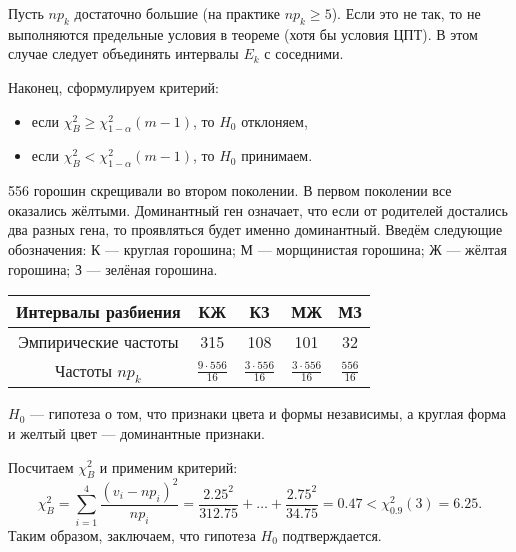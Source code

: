 \begin{remark*} 
  Пусть $np_k$ достаточно большие (на практике $np_k \geqslant
5$). Если это не так, то не выполняются предельные условия в теореме (хотя бы
условия ЦПТ). В этом случае следует объединять интервалы $E_k$ с соседними.
\end{remark*}

Наконец, сформулируем критерий:
\begin{itemize}[label=---]
  \item если $\chi^2_B \geqslant \chi^2_{1-\alpha} (m-1)$, то $H_0$ отклоняем,
  \item если $\chi^2_B < \chi^2_{1-\alpha}(m-1)$, то $H_0$ принимаем.
\end{itemize}

\begin{ex}[Мендель]
  556 горошин скрещивали во втором поколении.
  В первом поколении все оказались жёлтыми.
  Доминантный ген означает, что если от родителей достались два разных гена,
  то проявляться будет именно доминантный. Введём следующие обозначения: К ---
  круглая горошина; М --- морщинистая горошина; Ж --- жёлтая горошина; З ---
  зелёная горошина.
  
  \begin{center}
    \begin{tabular}{|c|c|c|c|c|}
      \hline
       Интервалы разбиения & КЖ & КЗ & МЖ & МЗ \\
      \hline
      Эмпирические частоты & 315 & 108 & 101 & 32 \\
      \hline
      Частоты $np_k$ & $\frac{9\cdot 556}{16}$ & $\frac{3\cdot 556}{16}$ &
      $\frac{3\cdot 556}{16}$ & \vphantom{\biggl|}$\frac{556}{16}$ \\
      \hline
    \end{tabular}
  \end{center}

  $H_0$ --- гипотеза о том, что признаки цвета и формы независимы, а круглая
  форма и желтый цвет --- доминантные признаки.

  Посчитаем $\chi^2_B$ и применим критерий:
  \[
    \chi^2_B = \sum_{i=1}^4 \frac{(v_i - np_i)^2}{np_i} = \frac{2.25^2}{312.75}
    + \ldots + \frac{2.75^2}{34.75} = 0.47 < \chi^2_{0.9} (3) = 6.25.
  \]
  Таким образом, заключаем, что гипотеза $H_0$ подтверждается.
\end{ex}
